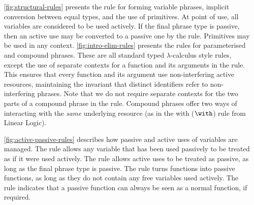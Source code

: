\autoref{fig:structural-rules} presents the rule for forming variable phrases, implicit conversion between equal types, and the use of primitives. At point of use, all variables are considered to be used actively. If the final phrase type is passive, then an active use may be converted to a passive one by the  rule. Primitives may be used in any context. \autoref{fig:intro-elim-rules} presents the rules for parameterised and compound phrases. These are all standard typed $\lambda$-calculus style rules, except the use of separate contexts for a function and its arguments in the  rule. This ensures that every function and its argument use non-interfering active resources, maintaining the invariant that distinct identifiers refer to non-interfering phrases. Note that we do not require separate contexts for the two parts of a compound phrase in the  rule. Compound phrases offer two ways of interacting with the \emph{same} underlying resource (as in the with ($\with$) rule from Linear Logic).

\autoref{fig:active-passive-rules} describes how passive and active uses of variables are managed. The  rule allows any variable that has been used passively to be treated as if it were used actively. The  rule allows active uses to be treated as passive, as long as the final phrase type is passive. The  rule turns functions into passive functions, as long as they do not contain any free variables used actively. The  rule indicates that a passive function can always be seen as a normal function, if required.

